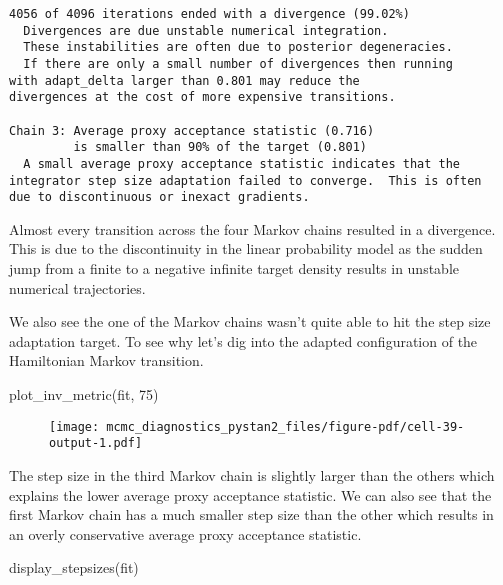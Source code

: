\documentclass[
  letterpaper,
  DIV=11,
  numbers=noendperiod]{scrartcl}
\newenvironment{Shaded}{\begin{snugshade}}{\end{snugshade}}
\newcommand{\DecValTok}[1]{\textcolor[rgb]{0.68,0.00,0.00}{#1}}
\newcommand{\NormalTok}[1]{\textcolor[rgb]{0.00,0.23,0.31}{#1}}
\begin{document}
\begin{verbatim}
4056 of 4096 iterations ended with a divergence (99.02%)
  Divergences are due unstable numerical integration.
  These instabilities are often due to posterior degeneracies.
  If there are only a small number of divergences then running
with adapt_delta larger than 0.801 may reduce the
divergences at the cost of more expensive transitions.

Chain 3: Average proxy acceptance statistic (0.716)
         is smaller than 90% of the target (0.801)
  A small average proxy acceptance statistic indicates that the
integrator step size adaptation failed to converge.  This is often
due to discontinuous or inexact gradients.

\end{verbatim}

Almost every transition across the four Markov chains resulted in a
divergence. This is due to the discontinuity in the linear probability
model as the sudden jump from a finite to a negative infinite target
density results in unstable numerical trajectories.

We also see the one of the Markov chains wasn't quite able to hit the
step size adaptation target. To see why let's dig into the adapted
configuration of the Hamiltonian Markov transition.

\begin{Shaded}
\begin{Highlighting}[]
\NormalTok{plot\_inv\_metric(fit, }\DecValTok{75}\NormalTok{)}
\end{Highlighting}
\end{Shaded}

\begin{figure}[H]

{\centering \texttt{[image: mcmc\_diagnostics\_pystan2\_files/figure-pdf/cell-39-output-1.pdf]}

}

\end{figure}

The step size in the third Markov chain is slightly larger than the
others which explains the lower average proxy acceptance statistic. We
can also see that the first Markov chain has a much smaller step size
than the other which results in an overly conservative average proxy
acceptance statistic.

\begin{Shaded}
\begin{Highlighting}[]
\NormalTok{display\_stepsizes(fit)}
\end{Highlighting}
\end{Shaded}
\end{document}
